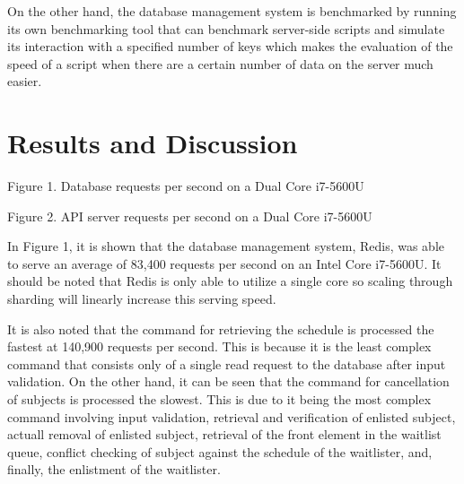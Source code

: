 \documentclass{sigchi}
\begin{document}
On the other hand, the database management system is benchmarked by running its own benchmarking tool that can benchmark server-side scripts and simulate its interaction with a specified number of keys which makes the evaluation of the speed of a script when there are a certain number of data on the server much easier.

\section{Results and Discussion}
\begin{center}
  Figure 1. Database requests per second on a Dual Core i7-5600U
\end{center}
\begin{center}
  Figure 2. API server requests per second on a Dual Core i7-5600U
\end{center}

In Figure 1, it is shown that the database management system, Redis, was able to serve an average of 83,400 requests per second on an Intel Core i7-5600U. It should be noted that Redis is only able to utilize a single core so scaling through sharding will linearly increase this serving speed.

It is also noted that the command for retrieving the schedule is processed the fastest at 140,900 requests per second. This is because it is the least complex command that consists only of a single read request to the database after input validation. On the other hand, it can be seen that the command for cancellation of subjects is processed the slowest. This is due to it being the most complex command involving input validation, retrieval and verification of enlisted subject, actuall removal of enlisted subject, retrieval of the front element in the waitlist queue, conflict checking of subject against the schedule of the waitlister, and, finally, the enlistment of the waitlister.
\end{document}
